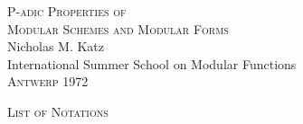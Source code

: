 \pagestyle{empty}
\thispagestyle{empty}

\begin{center}
\vspace*{4\baselineskip}
{\large\scshape P-adic Properties of}\\[0.4\baselineskip]
{\large\scshape Modular Schemes and Modular Forms}\\[3\baselineskip]
{\normalsize Nicholas M. Katz}\\[2\baselineskip]
{\small International Summer School on Modular Functions}\\[0.3\baselineskip]
{\small\scshape Antwerp 1972}
\end{center}

\clearpage
\pagestyle{plain}

\renewcommand{\contentsname}{Table of Contents}
\tableofcontents
\thispagestyle{plain}

\clearpage
\pagestyle{plain}
\begin{center}
{\normalsize\scshape List of Notations}
\end{center}
\vspace{1.2\baselineskip}

